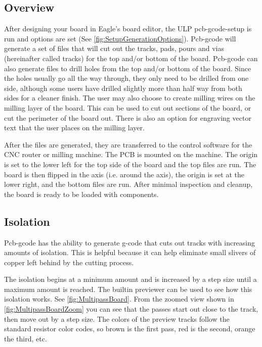 \documentclass[11pt]{book}
\begin{document}
\subsection{Overview}
After designing your board in Eagle's board editor, the ULP pcb-gcode-setup is run and options are set (See \figurename \vref{fig:SetupGenerationOptions}). Pcb-gcode will generate a set of files that will cut out the tracks, pads, pours and vias (hereinafter called tracks) for the top and/or bottom of the board. Pcb-gcode can also generate files to drill holes from the top and/or bottom of the board. Since the holes usually go all the way through, they only need to be drilled from one side, although some users have drilled slightly more than half way from both sides for a cleaner finish. The user may also choose to create milling wires on the milling layer of the board. This can be used to cut out sections of the board, or cut the perimeter of the board out. There is also an option for engraving vector text that the user places on the milling layer.

After the files are generated, they are transferred to the control software for the CNC router or milling machine. The PCB is mounted on the machine. The origin is set to the lower left for the top side of the board and the top files are run. The board is then flipped in the  axis (i.e. around the  axis), the origin is set at the lower right, and the bottom files are run. After minimal inspection and cleanup, the board is ready to be loaded with components.

\subsection{Isolation}
Pcb-gcode has the ability to generate g-code that cuts out tracks with increasing amounts of isolation. This is helpful because it can help eliminate small slivers of copper left behind by the cutting process.

The isolation begins at a minimum amount and is increased by a step size until a maximum amount is reached. The builtin previewer can be used to see how this isolation works. See \figurename \vref{fig:MultipassBoard}. From the zoomed view shown in \figurename \vref{fig:MultipassBoardZoom} you can see that the passes start out close to the track, then move out by a step size. The colors of the preview tracks follow the standard resistor color codes, so brown is the first pass, red is the second, orange the third, etc.
\end{document}
